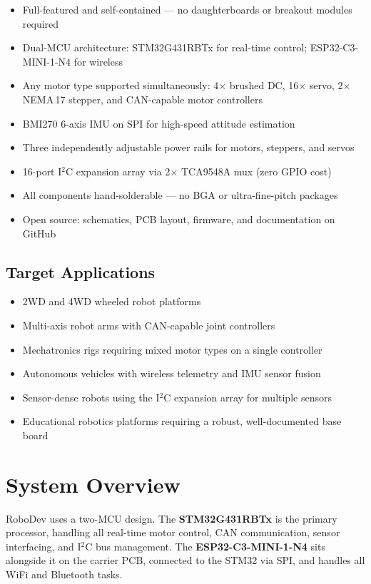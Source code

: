 \documentclass[11pt,a4paper]{article}
\begin{document}
\begin{itemize}
  \item Full-featured and self-contained --- no daughterboards or breakout modules required
  \item Dual-MCU architecture: STM32G431RBTx for real-time control; ESP32-C3-MINI-1-N4 for wireless
  \item Any motor type supported simultaneously: 4$\times$ brushed DC, 16$\times$ servo, 2$\times$ NEMA\,17 stepper, and CAN-capable motor controllers
  \item BMI270 6-axis IMU on SPI for high-speed attitude estimation
  \item Three independently adjustable power rails for motors, steppers, and servos
  \item 16-port I$^2$C expansion array via 2$\times$ TCA9548A mux (zero GPIO cost)
  \item All components hand-solderable --- no BGA or ultra-fine-pitch packages
  \item Open source: schematics, PCB layout, firmware, and documentation on GitHub
\end{itemize}

\subsection{Target Applications}

\begin{itemize}
  \item 2WD and 4WD wheeled robot platforms
  \item Multi-axis robot arms with CAN-capable joint controllers
  \item Mechatronics rigs requiring mixed motor types on a single controller
  \item Autonomous vehicles with wireless telemetry and IMU sensor fusion
  \item Sensor-dense robots using the I$^2$C expansion array for multiple sensors
  \item Educational robotics platforms requiring a robust, well-documented base board
\end{itemize}

\section{System Overview}

RoboDev uses a two-MCU design. The \textbf{STM32G431RBTx} is the primary processor, handling all real-time motor control, CAN communication, sensor interfacing, and I$^2$C bus management. The \textbf{ESP32-C3-MINI-1-N4} sits alongside it on the carrier PCB, connected to the STM32 via SPI, and handles all WiFi and Bluetooth tasks.
\end{document}

